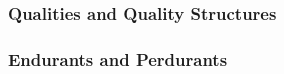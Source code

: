 \documentclass{article}
\newcommand{\BeginQualitiesAndQualityStructures}{1162}
\newcommand{\EndQualitiesAndQualityStructures}{1180}
\newcommand{\BeginEndurantsAndPerdurants}{1182}
\newcommand{\EndEndurantsAndPerdurants}{1201}
\begin{document}
\subsubsection{Qualities and Quality Structures}



\subsubsection{Endurants and Perdurants}



% 
% 
\end{document}
